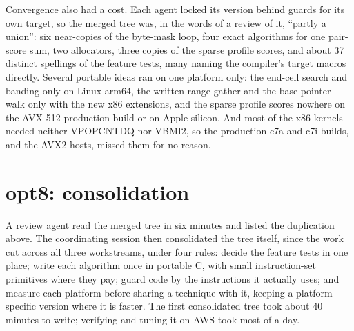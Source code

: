\documentclass[11pt]{article}
\begin{document}
Convergence also had a cost. Each agent locked its version behind guards for its own target,
so the merged tree was, in the words of a review of it, ``partly a union'': six near-copies of
the byte-mask loop, four exact algorithms for one pair-score sum, two allocators, three copies of
the sparse profile scores, and about 37 distinct spellings of the feature tests, many naming
the compiler's target macros directly. Several portable ideas ran on one platform only: the
end-cell search and banding only on Linux arm64, the written-range gather and the base-pointer
walk only with the new x86 extensions, and the sparse profile scores nowhere on the AVX-512
production build or on Apple silicon. And most of the x86 kernels needed neither VPOPCNTDQ nor
VBMI2, so the production c7a and c7i builds, and the AVX2 hosts, missed them for no reason.

\section{opt8: consolidation}
\label{sec:opt8}

A review agent read the merged tree in six minutes and listed the duplication above. The
coordinating session then consolidated the tree itself, since the work cut across all three
workstreams, under four rules: decide the feature tests in one place; write each algorithm once
in portable C, with small instruction-set primitives where they pay; guard code by the
instructions it actually uses; and measure each platform before sharing a technique with it,
keeping a platform-specific version where it is faster. The first consolidated tree took
about 40 minutes to write; verifying and tuning it on AWS took most of a day.
\end{document}

